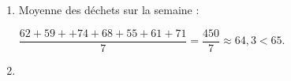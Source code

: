 \medskip

%

\begin{enumerate}
\item %

%
%
%

Moyenne des déchets sur la semaine : 

$\dfrac{62 + 59 + + 74 + 68 + 55 + 61 + 71}{7} = \dfrac{450}{7} \approx 64,3 < 65.$
\item %

%


\end{enumerate}
